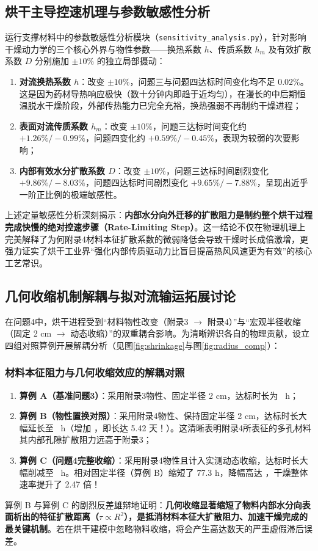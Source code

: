 \documentclass[12pt,a4paper]{ctexart}
\begin{document}
\subsection{烘干主导控速机理与参数敏感性分析}
运行支撑材料中的参数敏感性分析模块（\texttt{sensitivity\_analysis.py}），针对影响干燥动力学的三个核心外界与物性参数——换热系数 $h$、传质系数 $h_m$ 及有效扩散系数 $D$ 分别施加 $\pm 10\%$ 的独立局部摄动：
\begin{enumerate}[label=(\arabic*)]
  \item \textbf{对流换热系数 $h$}：改变 $\pm 10\%$，问题三与问题四达标时间变化均不足 $0.02\%$。这是因为药材导热响应极快（数十分钟内即趋于近均匀），在漫长的中后期恒温脱水干燥阶段，外部传热能力已完全充裕，换热强弱不再制约干燥进程；
  \item \textbf{表面对流传质系数 $h_m$}：改变 $\pm 10\%$，问题三达标时间变化约 $+1.26\% / -0.99\%$，问题四变化约 $+0.59\% / -0.45\%$，表现为较弱的次要影响；
  \item \textbf{内部有效水分扩散系数 $D$}：改变 $\pm 10\%$，问题三达标时间剧烈变化 $+9.86\% / -8.03\%$，问题四达标时间剧烈变化 $+9.65\% / -7.88\%$，呈现出近乎一阶正比例的极端敏感性。
\end{enumerate}
上述定量敏感性分析深刻揭示：\textbf{内部水分向外迁移的扩散阻力是制约整个烘干过程完成快慢的绝对控速步骤（Rate-Limiting Step）}。这一结论不仅在物理机理上完美解释了为何附录4材料本征扩散系数的微弱降低会导致干燥时长成倍激增，更强力证实了烘干工业界“强化内部传质驱动力比盲目提高热风风速更为有效”的核心工艺常识。

\subsection{几何收缩机制解耦与拟对流输运拓展讨论}\label{sec:mechanism_decoupling}
在问题4中，烘干进程受到“材料物性改变（附录3 $\to$ 附录4）”与“宏观半径收缩（固定 2 cm $\to$ 动态收缩）”的双重耦合影响。为清晰辨识各自的物理贡献，设立四组对照算例开展解耦分析（见图\ref{fig:shrinkage}与图\ref{fig:radius_comp}）：

\subsubsection{材料本征阻力与几何收缩效应的解耦对照}
\begin{enumerate}[label=(\arabic*)]
  \item \textbf{算例 A（基准问题3）}：采用附录3物性、固定半径 2 cm，达标时长为 \QThreeDryHours\ h；
  \item \textbf{算例 B（物性置换对照）}：采用附录4物性、保持固定半径 2 cm，达标时长大幅延长至 \AppendixFourFixedHours\ h（增加 \AppendixIncrease，即长达 5.42 天！）。这清晰表明附录4所表征的多孔材料其内部孔隙扩散阻力远高于附录3；
  \item \textbf{算例 C（问题4完整收缩）}：采用附录4物性且计入实测动态收缩，达标时长大幅削减至 \QFourDryHours\ h。相对固定半径（算例 B）缩短了 77.3 h，降幅高达 \ShrinkReduction，干燥整体速率提升了 2.47 倍！
\end{enumerate}
算例 B 与算例 C 的剧烈反差雄辩地证明：\textbf{几何收缩显著缩短了物料内部水分向表面析出的特征扩散距离（$\tau \propto R^2$），是抵消材料本征大扩散阻力、加速干燥完成的最关键机制}。若在烘干建模中忽略物料收缩，将会产生高达数天的严重虚假滞后误差。
\end{document}
